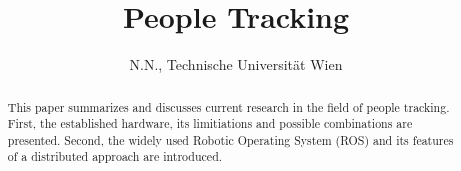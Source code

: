 \documentclass[a4paper,oneside,10pt,DIV12,headsepline,footexclude,headexclude]{scrartcl}
\newif\ifpdf
\let\ifpdf\relax
\begin{document}
\ifpdf
\else
\fi


\pagestyle{plain} %

\title{\Large People Tracking}

\author{\large N.N., Technische Universität Wien}

\maketitle

\begin{abstract}
This paper summarizes and discusses current research in the field of 
people tracking.
First, the established hardware, its limitiations and
possible combinations are presented. Second, the widely used Robotic
Operating System (ROS) and its features of a distributed approach are introduced.\\

\end{abstract}
\end{document}
